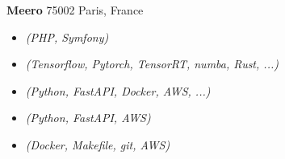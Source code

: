 \documentclass[a4paper]{article}
\newcommand\en[1]{}
\newcommand\fr[1]{}
\begin{document}
    \textbf{Meero}
        \hfill 75002 Paris, France\\
        \en{ \textit{"Backend programmer"} \hfill March 2020 - June 2020\\}
        \fr{ \textit{"Développeur backend"} \hfill mars 2020 - juin 2020\\}
        \vspace{-1mm}
        \begin{itemize} \itemsep 1pt
            \item
                \en{Creation of unit \& functional tests for the Meero platform}
                \fr{Écriture de tests unitaires \& fonctionnels pour la plateform Meero}
                {\sl (PHP, Symfony)}
            \item
                \en{Optimization of image enhancement algorithms written by the R\&D team}
                \fr{Optimisation d’algorithmes d'améliaration d'image écrits par la R\&D}
                {\sl (Tensorflow, Pytorch, TensorRT, numba, Rust, ...)}
            \item
                \en{Integration of algorithms into a micro-services environment}
                \fr{Intégration d’algorithmes dans un système de micro-services}
                {\sl (Python, FastAPI, Docker, AWS, ...)}
            \item
                \en{Work on a custom orchestrator for micro-services}
                \fr{Travail sur un orchestrateur pour gérer les micro-services}
                {\sl (Python, FastAPI, AWS)}
            \item
                \en{Creation of an intuitive and efficient workflow for the R\&D team}
                \fr{Création et mise en place d’un workflow intuitif et efficace pour la R\&D}
                {\sl (Docker, Makefile, git, AWS)}
        \end{itemize}
\end{document}
